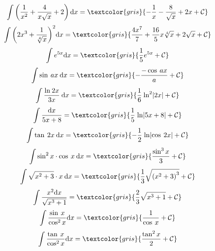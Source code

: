 {\begin{fleqn}
	\begin{equation}
		\int \left(\frac 1 {x^2}+ \frac 4 {x\sqrt x}+2 \right)\mathrm{d}x=\textcolor{gris}{-\frac 1 x - \frac 8 {\sqrt x}+2x + \mathcal C}
	\end{equation}
	\begin{equation}
		\int {\left(2x^3+\frac 1 {\sqrt[4]x} \right)}^2 \mathrm{d}x=\textcolor{gris}{\frac {4x^7}{7}+ \frac {16} {5} x \sqrt[4]{x}+2\sqrt {x}+\mathcal C}
	\end{equation}
	\begin{equation}
	\int e^{5x}\mathrm{d}x=\textcolor{gris}{\frac 1 5 e^{5x}+\mathcal C} 	
	\end{equation}
	\begin{equation}
		\int \sin \:ax\:\mathrm{d}x=\textcolor{gris}{-\frac {-\cos \: ax}{a}+\mathcal C}
	\end{equation}
	\begin{equation}
		\int \frac {\mathrm{ln}\:2x}{3x}\:\mathrm{d}x=\textcolor{gris}{\frac 1 6 \: \mathrm{ln}^2 |2x| + \mathcal C}
	\end{equation}
	\begin{equation}
		\int  \frac {\mathrm{d}x} {5x+8} =\textcolor{gris}{ \frac {1} {5}  \;\mathrm{ln} \abs{5x+8}+\mathcal C}
	\end{equation}
	\begin{equation}
		\int \tan \: 2x \: \mathrm{d}x =\textcolor{gris}{ -\frac 1 2 \; \mathrm{ln} \abs{\cos\: 2x}+\mathcal C}
	\end{equation}
	\begin{equation}
		\int \sin^2x\cdot \cos\:x\:\mathrm{d}x=\textcolor{gris}{\frac{\sin^3 x}{3}+\mathcal C}
	\end{equation}
	\begin{equation}
		\int \sqrt{x^2 +3} \cdot x\:\mathrm{d}x=\textcolor{gris}{\frac 1 3 \sqrt{{(x^2+3)}^3}+\mathcal C}
	\end{equation}
	\begin{equation}
		\int \frac{x^2 \mathrm{d}x}{\sqrt{x^3+1}}=\textcolor{gris}{\frac 2 3 \sqrt{x^3+1}+\mathcal C}
	\end{equation}
	\begin{equation}
		\int \frac{\sin\:x}{\cos^2x}\mathrm{d}x=\textcolor{gris}{\frac 1 {\cos\:x}+\mathcal C}
	\end{equation}
	\begin{equation}
		\int \frac{\tan\:x}{\cos^2x}\mathrm{d}x=\textcolor{gris}{\frac{\tan^2x}{2}+\mathcal C}
	\end{equation}

\end{fleqn}}
